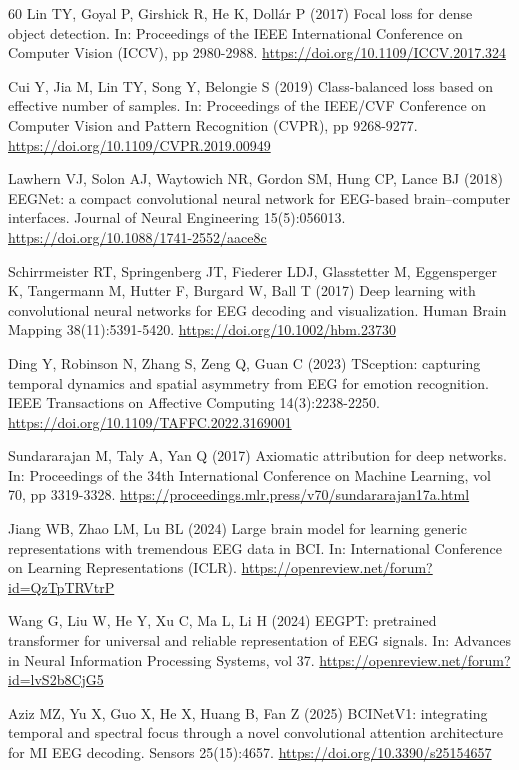 \begin{thebibliography}{60}
 Lin TY, Goyal P, Girshick R, He K, Doll\'ar P (2017) Focal loss for dense object detection. In: Proceedings of the IEEE International Conference on Computer Vision (ICCV), pp 2980-2988. \url{https://doi.org/10.1109/ICCV.2017.324}

 Cui Y, Jia M, Lin TY, Song Y, Belongie S (2019) Class-balanced loss based on effective number of samples. In: Proceedings of the IEEE/CVF Conference on Computer Vision and Pattern Recognition (CVPR), pp 9268-9277. \url{https://doi.org/10.1109/CVPR.2019.00949}

 Lawhern VJ, Solon AJ, Waytowich NR, Gordon SM, Hung CP, Lance BJ (2018) EEGNet: a compact convolutional neural network for EEG-based brain--computer interfaces. Journal of Neural Engineering 15(5):056013. \url{https://doi.org/10.1088/1741-2552/aace8c}

 Schirrmeister RT, Springenberg JT, Fiederer LDJ, Glasstetter M, Eggensperger K, Tangermann M, Hutter F, Burgard W, Ball T (2017) Deep learning with convolutional neural networks for EEG decoding and visualization. Human Brain Mapping 38(11):5391-5420. \url{https://doi.org/10.1002/hbm.23730}

 Ding Y, Robinson N, Zhang S, Zeng Q, Guan C (2023) TSception: capturing temporal dynamics and spatial asymmetry from EEG for emotion recognition. IEEE Transactions on Affective Computing 14(3):2238-2250. \url{https://doi.org/10.1109/TAFFC.2022.3169001}

 Sundararajan M, Taly A, Yan Q (2017) Axiomatic attribution for deep networks. In: Proceedings of the 34th International Conference on Machine Learning, vol 70, pp 3319-3328. \url{https://proceedings.mlr.press/v70/sundararajan17a.html}

 Jiang WB, Zhao LM, Lu BL (2024) Large brain model for learning generic representations with tremendous EEG data in BCI. In: International Conference on Learning Representations (ICLR). \url{https://openreview.net/forum?id=QzTpTRVtrP}

 Wang G, Liu W, He Y, Xu C, Ma L, Li H (2024) EEGPT: pretrained transformer for universal and reliable representation of EEG signals. In: Advances in Neural Information Processing Systems, vol 37. \url{https://openreview.net/forum?id=lvS2b8CjG5}

 Aziz MZ, Yu X, Guo X, He X, Huang B, Fan Z (2025) BCINetV1: integrating temporal and spectral focus through a novel convolutional attention architecture for MI EEG decoding. Sensors 25(15):4657. \url{https://doi.org/10.3390/s25154657}


\end{thebibliography}
